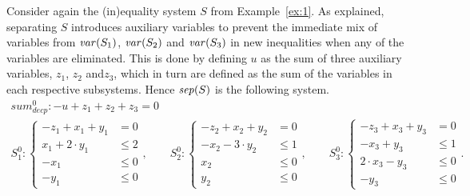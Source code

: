 \begin{example}\label{ex:2}
Consider again the (in)equality system $S$ from Example~\ref{ex:1}. As explained, separating $S$ introduces auxiliary variables to prevent the immediate mix of variables from $\mathit{var}(S_1)$, $\mathit{var}(S_2)$ and $\mathit{var}(S_3)$ in new inequalities when any of the variables are eliminated. This is done by defining $u$ as the sum of three auxiliary variables, $z_1$, $z_2$ and$ z_3$, which in turn are defined as the sum of the variables in each respective subsystems. Hence $\mathit{sep}(S)$ is the following system.
\begin{gather*}
\mathit{sum}^0_{decp}: -u + z_1 + z_2 + z_3 = 0\\
S_1^0 : \left\{ \begin{array}{ll}-z_1 + x_1 + y_1 &= 0\\
															  x_1 + 2 \cdot y_1 &\leq 2\\
															 -x_1 &\leq 0\\
															 -y_1 &\leq 0\end{array}\right.,\qquad
S_2^0 : \left\{ \begin{array}{ll} -z_2 + x_2 + y_2 &= 0\\
																-x_2 - 3\cdot y_2 &\leq 1\\
																 x_2 &\leq 0\\
																 y_2 &\leq 0\end{array}\right.,\qquad
S_3^0 : \left\{ \begin{array}{ll} -z_3 + x_3 + y_3 &= 0\\
																 -x_3 + y_3 &\leq 1\\
																 2\cdot x_3 - y_3 &\leq 0\\
																 -y_3 &\leq 0\end{array}\right..

\end{gather*}
\end{example}
